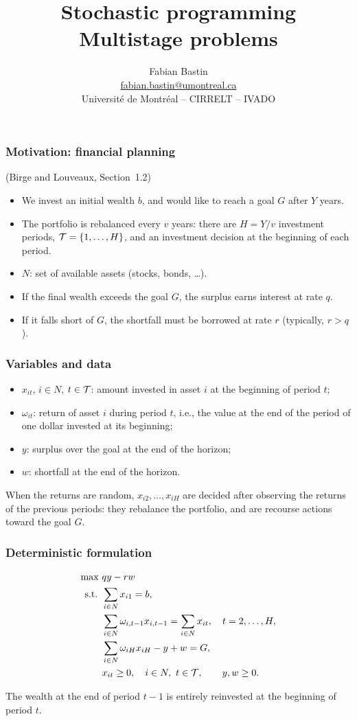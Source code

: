 \documentclass[aspectratio=169]{beamer}
\title[Multistage problems]{Stochastic programming\texorpdfstring{\\}{: }Multistage problems}
\author[Fabian Bastin]{Fabian Bastin \\ \texorpdfstring{\url{fabian.bastin@umontreal.ca}}{fabian.bastin@umontreal.ca} \\ Université de Montréal -- CIRRELT -- IVADO}
\date{}
\begin{document}
\frame{\titlepage}

\begin{frame}
\frametitle{Motivation: financial planning}

(Birge and Louveaux, Section~1.2)

\begin{itemize}
\item
We invest an initial wealth $b$, and would like to reach a goal $G$ after $Y$ years.
\item
The portfolio is rebalanced every $v$ years: there are $H = Y/v$ investment periods, ${\mathcal{T}} = \lbrace 1, \ldots, H \rbrace$, and an investment decision at the beginning of each period.
\item
$N$: set of available assets (stocks, bonds, \ldots).
\item
If the final wealth exceeds the goal $G$, the surplus earns interest at rate $q$.
\item
If it falls short of $G$, the shortfall must be borrowed at rate $r$ (typically, $r > q$).
\end{itemize}

\end{frame}

\begin{frame}
\frametitle{Variables and data}

\begin{itemize}
\item
$x_{it}$, $i \in N$, $t \in {\mathcal{T}}$: amount invested in asset $i$ at the beginning of period $t$;
\item
$\omega_{it}$: return of asset $i$ during period $t$, i.e., the value at the end of the period of one dollar invested at its beginning;
\item
$y$: surplus over the goal at the end of the horizon;
\item
$w$: shortfall at the end of the horizon.
\end{itemize}

\mbox{}

When the returns are random, $x_{i2}, \ldots, x_{iH}$ are decided after observing the returns of the previous periods: they rebalance the portfolio, and are recourse actions toward the goal $G$.

\end{frame}

\begin{frame}
\frametitle{Deterministic formulation}

\begin{align*}
\max\ & qy - rw \\
\mbox{s.t. } & \sum_{i \in N} x_{i1} = b, \\
& \sum_{i \in N} \omega_{i,t-1}x_{i,t-1} = \sum_{i \in N} x_{it}, \quad t = 2, \ldots, H, \\
& \sum_{i \in N} \omega_{iH}x_{iH} - y + w = G, \\
& x_{it} \geq 0, \quad i \in N,\ t \in {\mathcal{T}}, \qquad y, w \geq 0.
\end{align*}

The wealth at the end of period $t-1$ is entirely reinvested at the beginning of period $t$.

\end{frame}
\end{document}
